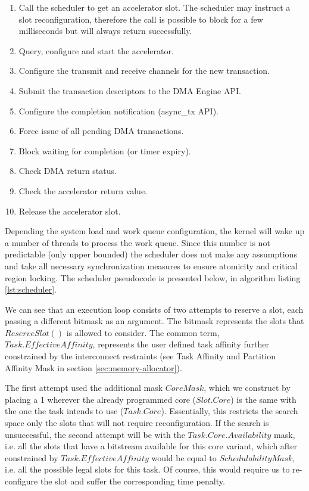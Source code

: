 \begin{enumerate}
\item	Call the scheduler to get an accelerator slot. The scheduler may instruct a
	slot reconfiguration, therefore the call is possible to block for a few milliseconds
	but will always return successfully.
\item	Query, configure and start the accelerator.
\item	Configure the transmit and receive channels for the new transaction.
\item	Submit the transaction descriptors to the DMA Engine API.
\item	Configure the completion notification (async\_tx API).
\item	Force issue of all pending DMA transactions.
\item	Block waiting for completion (or timer expiry).
\item	Check DMA return status.
\item	Check the accelerator return value.
\item	Release the accelerator slot.
\end{enumerate}

Depending the system load and work queue configuration, the kernel will wake up
a number of threads to process the work queue. Since this number is not predictable
(only upper bounded) the scheduler does not make any assumptions and take all necessary
synchronization measures to ensure atomicity and critical region locking.
The scheduler pseudocode is presented below, in algorithm listing \ref{lst:scheduler}.

We can see that an execution loop consists of two attempts to reserve a slot,
each passing a different bitmask as an argument. The bitmask represents the slots
that $ReserveSlot()$ is allowed to consider. The common term, $Task.EffectiveAffinity$,
represents the user defined task affinity further constrained by the interconnect restraints
(see Task Affinity and Partition Affinity Mask in section \ref{sec:memory-allocator}).

The first attempt used the additional mask $CoreMask$,
which we construct by placing a 1 wherever the already programmed core ($Slot.Core$) is the same with the one
the task intends to use ($Task.Core$). Essentially, this restricts the search space only the slots that
will not require reconfiguration. If the search is unsuccessful, the second attempt will be with the
$Task.Core.Availability$ mask, i.e. all the slots that have a bitstream available for this core variant,
which after constrained by $Task.EffectiveAffinity$ would be equal to $SchedulabilityMask$, 
i.e. all the possible legal slots for this task.
Of course, this would require us to re-configure the slot and suffer the corresponding time penalty.

